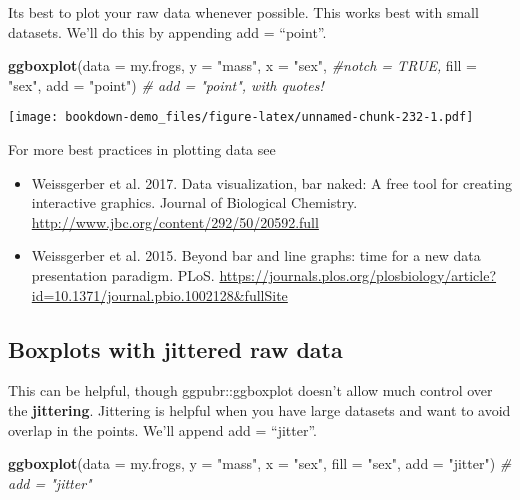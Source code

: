 \documentclass[]{book}
\newenvironment{Shaded}{\begin{snugshade}}{\end{snugshade}}
\newcommand{\KeywordTok}[1]{\textcolor[rgb]{0.13,0.29,0.53}{\textbf{#1}}}
\newcommand{\DataTypeTok}[1]{\textcolor[rgb]{0.13,0.29,0.53}{#1}}
\newcommand{\StringTok}[1]{\textcolor[rgb]{0.31,0.60,0.02}{#1}}
\newcommand{\CommentTok}[1]{\textcolor[rgb]{0.56,0.35,0.01}{\textit{#1}}}
\newcommand{\NormalTok}[1]{#1}
\providecommand{\tightlist}{%
  \setlength{\itemsep}{0pt}\setlength{\parskip}{0pt}}
\theoremstyle{definition}
\theoremstyle{definition}
\theoremstyle{definition}
\theoremstyle{remark}
\begin{document}
Its best to plot your raw data whenever possible. This works best with
small datasets. We'll do this by appending add = ``point''.

\begin{Shaded}
\begin{Highlighting}[]
\KeywordTok{ggboxplot}\NormalTok{(}\DataTypeTok{data =}\NormalTok{ my.frogs,}
          \DataTypeTok{y =} \StringTok{"mass"}\NormalTok{,}
          \DataTypeTok{x =} \StringTok{"sex"}\NormalTok{,}
          \CommentTok{#notch  = TRUE,}
          \DataTypeTok{fill =} \StringTok{"sex"}\NormalTok{,}
          \DataTypeTok{add =} \StringTok{"point"}\NormalTok{)   }\CommentTok{# add = "point", with quotes!}
\end{Highlighting}
\end{Shaded}

\texttt{[image: bookdown-demo\_files/figure-latex/unnamed-chunk-232-1.pdf]}

For more best practices in plotting data see

\begin{itemize}
\tightlist
\item
  Weissgerber et al. 2017. Data visualization, bar naked: A free tool
  for creating interactive graphics. Journal of Biological Chemistry.
  \url{http://www.jbc.org/content/292/50/20592.full}
\item
  Weissgerber et al. 2015. Beyond bar and line graphs: time for a new
  data presentation paradigm. PLoS.
  \url{https://journals.plos.org/plosbiology/article?id=10.1371/journal.pbio.1002128\&fullSite}
\end{itemize}

\subsection{Boxplots with jittered raw
data}\label{boxplots-with-jittered-raw-data}

This can be helpful, though ggpubr::ggboxplot doesn't allow much control
over the \textbf{jittering}. Jittering is helpful when you have large
datasets and want to avoid overlap in the points. We'll append add =
``jitter''.

\begin{Shaded}
\begin{Highlighting}[]
\KeywordTok{ggboxplot}\NormalTok{(}\DataTypeTok{data =}\NormalTok{ my.frogs,}
          \DataTypeTok{y =} \StringTok{"mass"}\NormalTok{,}
          \DataTypeTok{x =} \StringTok{"sex"}\NormalTok{,}
          \DataTypeTok{fill =} \StringTok{"sex"}\NormalTok{,}
          \DataTypeTok{add =} \StringTok{"jitter"}\NormalTok{) }\CommentTok{# add = "jitter"}
\end{Highlighting}
\end{Shaded}
\end{document}
